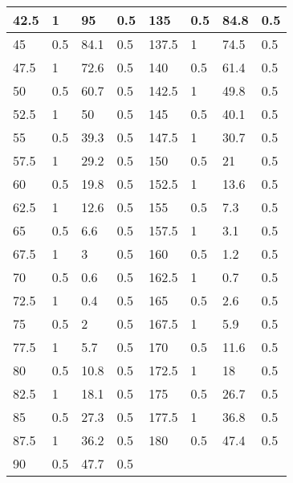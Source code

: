 \begin{table}[h!]
\begin{tabular}{|l|l|l|l||l|l|l|l|}
42.5  & 1           & 95      & 0.5     & 135   & 0.5         & 84.8    & 0.5     \\ \hline
45    & 0.5         & 84.1    & 0.5     & 137.5 & 1           & 74.5    & 0.5     \\ \hline
47.5  & 1           & 72.6    & 0.5     & 140   & 0.5         & 61.4    & 0.5     \\ \hline
50    & 0.5         & 60.7    & 0.5     & 142.5 & 1           & 49.8    & 0.5     \\ \hline
52.5  & 1           & 50      & 0.5     & 145   & 0.5         & 40.1    & 0.5     \\ \hline
55    & 0.5         & 39.3    & 0.5     & 147.5 & 1           & 30.7    & 0.5     \\ \hline
57.5  & 1           & 29.2    & 0.5     & 150   & 0.5         & 21      & 0.5     \\ \hline
60    & 0.5         & 19.8    & 0.5     & 152.5 & 1           & 13.6    & 0.5     \\ \hline
62.5  & 1           & 12.6    & 0.5     & 155   & 0.5         & 7.3     & 0.5     \\ \hline
65    & 0.5         & 6.6     & 0.5     & 157.5 & 1           & 3.1     & 0.5     \\ \hline
67.5  & 1           & 3       & 0.5     & 160   & 0.5         & 1.2     & 0.5     \\ \hline
70    & 0.5         & 0.6     & 0.5     & 162.5 & 1           & 0.7     & 0.5     \\ \hline
72.5  & 1           & 0.4     & 0.5     & 165   & 0.5         & 2.6     & 0.5     \\ \hline
75    & 0.5         & 2       & 0.5     & 167.5 & 1           & 5.9     & 0.5     \\ \hline
77.5  & 1           & 5.7     & 0.5     & 170   & 0.5         & 11.6    & 0.5     \\ \hline
80    & 0.5         & 10.8    & 0.5     & 172.5 & 1           & 18      & 0.5     \\ \hline
82.5  & 1           & 18.1    & 0.5     & 175   & 0.5         & 26.7    & 0.5     \\ \hline
85    & 0.5         & 27.3    & 0.5     & 177.5 & 1           & 36.8    & 0.5     \\ \hline
87.5  & 1           & 36.2    & 0.5     & 180   & 0.5         & 47.4    & 0.5     \\ \hline
90    & 0.5         & 47.7    & 0.5     &       &             &         &         \\ \hline
\end{tabular}
\end{table}